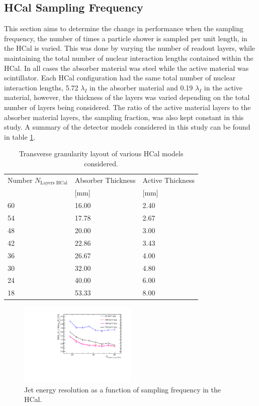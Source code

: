 \subsection{HCal Sampling Frequency}
\label{sec:hcalsamplingfrequency}
This section aims to determine the change in performance when the sampling frequency, the number of times a particle shower is sampled per unit length, in the HCal is varied.  This was done by varying the number of readout layers, while maintaining the total number of nuclear interaction lengths contained within the HCal.  In all cases the absorber material was steel while the active material was scintillator.  Each HCal configuration had the same total number of nuclear interaction lengths, 5.72 $\lambda_{I}$ in the absorber material and 0.19 $\lambda_{I}$ in the active material, however, the thickness of the layers was varied depending on the total number of layers being considered.  The ratio of the active material layers to the absorber material layers, the sampling fraction, was also kept constant in this study.  A summary of the detector models considered in this study can be found in table \ref{table:nlayershcaloption}.  

\begin{table}[h!]
\centering
\begin{tabular}{ l l l }
\hline
Number $N_{\text{Layers HCal}}$& Absorber Thickness & Active Thickness \\
 & [mm] & [mm] \\
\hline
60 & 16.00 & 2.40 \\ 
54 & 17.78 & 2.67 \\
48 & 20.00 & 3.00 \\
42 & 22.86 & 3.43 \\
36 & 26.67 & 4.00 \\
30 & 32.00 & 4.80 \\
24 & 40.00 & 6.00 \\
18 & 53.33 & 8.00 \\
\hline
\end{tabular}
\caption[Transverse granularity layout of various HCal models considered.]{Transverse granularity layout of various HCal models considered.}
\label{table:nlayershcaloption}
\end{table}

\begin{figure}
\centering
\includegraphics[width=0.5\textwidth]{OptimisationStudies/Plots/JetEnergyResolutions/JER_vs_NumberOfLayersInTheHCal.pdf}
\caption[Jet energy resolution as a function of sampling frequency in the HCal.]{Jet energy resolution as a function of sampling frequency in the HCal.}
\label{fig:hcalnlayers}
\end{figure}

